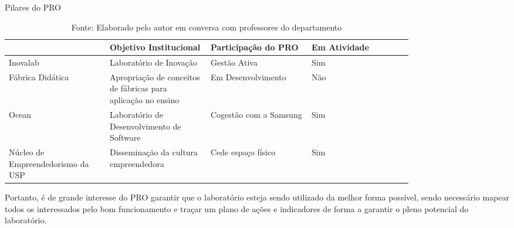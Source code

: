 \begin{table}[h]
\begin{center}
\caption{Pilares do PRO}
\label{tab:pilares_pro}
{\def\arraystretch{2}\tabcolsep=10pt
\begin{tabular}{>{\raggedright}p{0.2\linewidth}>{\raggedright\arraybackslash}p{0.2\linewidth}>{\raggedright\arraybackslash}p{0.2\linewidth}>{\raggedright\arraybackslash}p{0.2\linewidth}}
\hline
     & Objetivo Institucional & Participação do PRO & Em Atividade  \\ \hline
     Inovalab & Laboratório de Inovação & Gestão Ativa & Sim  \\
     Fábrica Didática & Apropriação de conceitos de fábricas para aplicação no ensino & Em Desenvolvimento & Não \\
     Ocean & Laboratório de Desenvolvimento de Software & Cogestão com a Samsung & Sim \\
	 Núcleo de Empreendedorismo da USP & Disseminação da cultura empreendedora & Cede espaço físico & Sim \\ \hline
\end{tabular}%
}
\caption* {Fonte: Elaborado pelo autor em conversa com professores do departamento}
\end{center}
\end{table}

Portanto, é de grande interesse do PRO garantir que o laboratório esteja sendo utilizado da melhor forma possível, sendo necessário mapear todos os interessados pelo bom funcionamento e traçar um plano de ações e indicadores de forma a garantir o pleno potencial do laboratório.